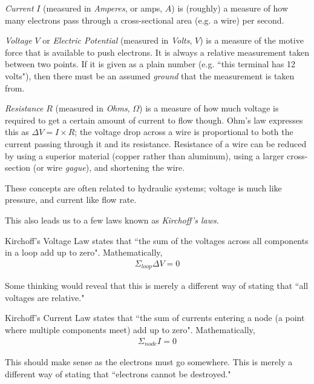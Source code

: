 \begin{asparaenum}[a)]
	\item \textit{Current} $I$ (measured in \textit{Amperes}, or amps, $A$) is (roughly) a measure of how many electrons pass through a cross-sectional area (e.g. a wire) per second.
	\item \textit{Voltage} $V$ or \textit{Electric Potential} (measured in \textit{Volts}, $V$) is a measure of the motive force that is available to push electrons. It is always a relative measurement taken between two points. If it is given as a plain number (e.g. ``this terminal has 12 volts"), then there must be an assumed \textit{ground} that the measurement is taken from.
	\item \textit{Resistance} $R$ (measured in \textit{Ohms}, $\Omega$) is a measure of how much voltage is required to get a certain amount of current to flow though. Ohm's law expresses this as $\Delta V = I \times R$; the voltage drop across a wire is proportional to both the current passing through it and its resistance. Resistance of a wire can be reduced by using a superior material (copper rather than aluminum), using a larger cross-section (or wire \textit{gague}), and shortening the wire.
\end{asparaenum}

These concepts are often related to hydraulic systems; voltage is much like pressure, and current like flow rate.

This also leads us to a few laws known as \textit{Kirchoff's laws}.

Kirchoff's Voltage Law states that ``the sum of the voltages across all components in a loop add up to zero". Mathematically,
\begin{align}
	\Sigma_{loop} \Delta V = 0
\end{align}

Some thinking would reveal that this is merely a different way of stating that ``all voltages are relative."

Kirchoff's Current Law states that ``the sum of currents entering a node (a point where multiple components meet) add up to zero". Mathematically,
\begin{align}
	\Sigma_{node} I = 0
\end{align}

This should make sense as the electrons must go somewhere. This is merely a different way of stating that ``electrons cannot be destroyed."